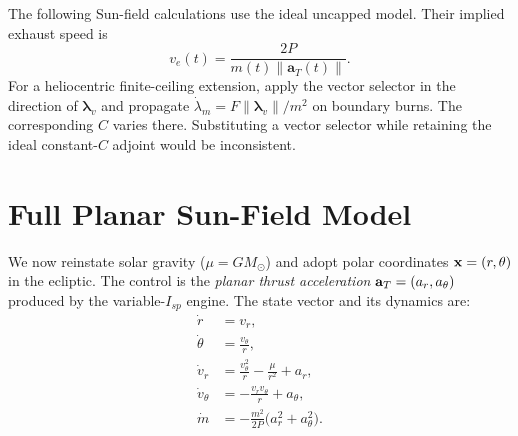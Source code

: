 \documentclass[journal,a4paper]{IEEEtran}
\begin{document}
The following Sun-field calculations use the ideal uncapped model.
Their implied exhaust speed is
\begin{equation}
 v_e(t)=\frac{2P}{m(t)\|\mathbf a_T(t)\|}.
 \label{eq:ve_diagnostic_uncapped}
\end{equation}
For a heliocentric finite-ceiling extension, apply the vector selector
in the direction of $\boldsymbol\lambda_v$ and propagate
$\dot\lambda_m=F\|\boldsymbol\lambda_v\|/m^2$ on boundary burns.
The corresponding $C$ varies there. Substituting a vector selector while
retaining the ideal constant-$C$ adjoint would be inconsistent.

\section{Full Planar Sun-Field Model}
\label{sec:SunModel}
We now reinstate solar gravity ($\mu=GM_\odot$) and adopt polar coordinates ${\bf x}=(r,\theta)$ in the ecliptic. The control is the \emph{planar thrust acceleration} ${\bf a}_{T}=(a_r,a_\theta)$ produced by the variable-$I_{\!sp}$ engine. The state vector and its dynamics are:
\begin{subequations}\label{eq:StateDyn}
\begin{align}
  \dot r       &= v_r, \\
  \dot\theta   &= \frac{v_\theta}{r}, \\
  \dot v_r     &= \frac{v_\theta^{2}}{r}-\frac{\mu}{r^{2}} + a_r, \\
  \dot v_\theta&= -\frac{v_r v_\theta}{r} + a_\theta, \\
  \dot m       &= -\frac{m^{2}}{2P}\bigl(a_r^{2}+a_\theta^{2}\bigr).
\end{align}
\end{subequations}
\end{document}
